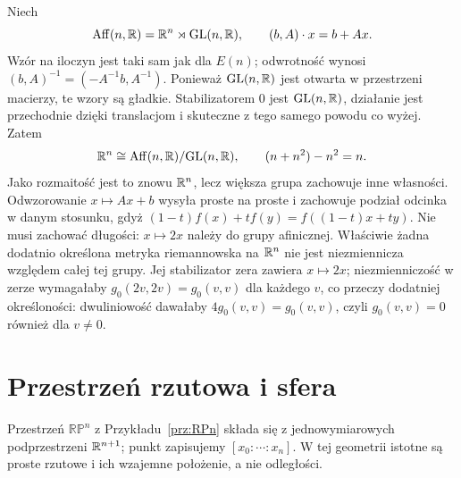 \begin{przyklad}
\label{prz:klein-afiniczna}
Niech
\[
 \operatorname{Aff}(n,\mathbb{R})
 =\mathbb{R}^n\rtimes\mathrm{GL}(n,\mathbb{R}),\qquad
 (b,A)\cdot x=b+Ax.
\]
Wzór na iloczyn jest taki sam jak dla $E(n)$; odwrotność
wynosi $(b,A)^{-1}=(-A^{-1}b,A^{-1})$. Ponieważ
$\mathrm{GL}(n,\mathbb{R})$ jest otwarta w przestrzeni macierzy,
te wzory są gładkie. Stabilizatorem $0$ jest
$\mathrm{GL}(n,\mathbb{R})$, działanie jest przechodnie dzięki
translacjom i skuteczne z tego samego powodu co wyżej.
Zatem
\[
 \mathbb{R}^n\cong\operatorname{Aff}(n,\mathbb{R})/\mathrm{GL}(n,\mathbb{R}),
 \qquad (n+n^2)-n^2=n.
\]
Jako rozmaitość jest to znowu $\mathbb{R}^n$, lecz większa grupa
zachowuje inne własności. Odwzorowanie $x\mapsto Ax+b$
wysyła proste na proste i zachowuje podział odcinka w danym
stosunku, gdyż
$(1-t)f(x)+tf(y)=f((1-t)x+ty)$. Nie musi zachować długości:
$x\mapsto2x$ należy do grupy afinicznej.
Właściwie żadna dodatnio określona metryka riemannowska
na $\mathbb{R}^n$ nie jest niezmiennicza względem całej tej grupy.
Jej stabilizator zera zawiera $x\mapsto2x$; niezmienniczość
w zerze wymagałaby $g_0(2v,2v)=g_0(v,v)$ dla każdego $v$,
co przeczy dodatniej określoności:
dwuliniowość dawałaby $4g_0(v,v)=g_0(v,v)$,
czyli $g_0(v,v)=0$ również dla $v\ne0$.
\end{przyklad}

\section{Przestrzeń rzutowa i sfera}
\label{sec:klein-rzutowa-sfera}

Przestrzeń $\mathbb{RP}^n$ z Przykładu~\ref{prz:RPn}
składa się z jednowymiarowych podprzestrzeni $\mathbb{R}^{n+1}$;
punkt zapisujemy $[x_0:\cdots:x_n]$. W tej geometrii istotne
są proste rzutowe i ich wzajemne położenie, a nie odległości.

